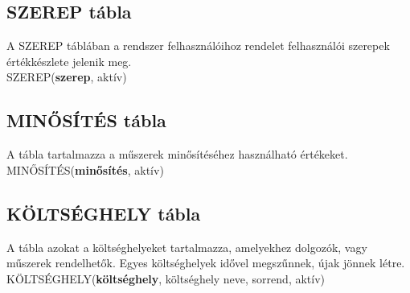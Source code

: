 \documentclass[a4paper,12pt]{report}
\newcommand{\PK}[1]{\textbf{#1}}
\newcommand{\TABLA}[1]{\noindent\MakeUppercase{#1}}
\begin{document}
\subsection{SZEREP tábla}
A \TABLA{szerep} táblában a rendszer felhasználóihoz rendelet felhasználói 
szerepek értékkészlete jelenik meg.\\

\TABLA{SZEREP}(\PK{szerep}, aktív)

\subsection{MINŐSÍTÉS tábla}
A tábla tartalmazza a műszerek minősítéséhez használható értékeket.\\

\TABLA{MINŐSÍTÉS}(\PK{minősítés}, aktív)

\subsection{KÖLTSÉGHELY tábla}
A tábla azokat a költséghelyeket tartalmazza, amelyekhez dolgozók, vagy 
műszerek rendelhetők. Egyes költséghelyek idővel megszűnnek, újak jönnek
létre.\\

\TABLA{KÖLTSÉGHELY}(\PK{költséghely}, költséghely neve, sorrend, aktív)







%
% 
\end{document}
